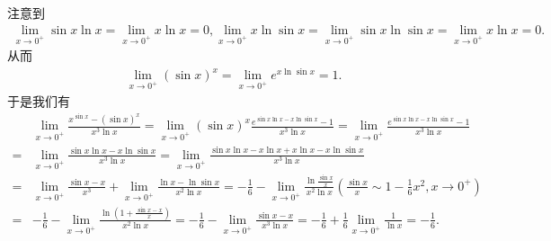 \documentclass[lang=cn,newtx,10pt,scheme=chinese]{elegantbook}
\begin{document}
\begin{solution}
注意到\begin{align*}
   \lim_{x\rightarrow0^{+}}\sin x\ln x=\lim_{x\rightarrow0^{+}}x\ln x = 0, \lim_{x\rightarrow0^{+}}x\ln\sin x=\lim_{x\rightarrow0^{+}}\sin x\ln\sin x=\lim_{x\rightarrow0^{+}}x\ln x = 0.
\end{align*}
从而
\begin{align*}
   \lim_{x\rightarrow 0^+} (\sin x)^x=\lim_{x\rightarrow 0^+} e^{x\ln\sin x}=1.
\end{align*}
于是我们有
   \begin{align*}
   &\lim_{x\rightarrow0^{+}}\frac{x^{\sin x}-(\sin x)^{x}}{x^{3}\ln x}=\lim_{x\rightarrow0^{+}}(\sin x)^{x}\frac{e^{\sin x\ln x - x\ln\sin x}-1}{x^{3}\ln x}=\lim_{x\rightarrow0^{+}}\frac{e^{\sin x\ln x - x\ln\sin x}-1}{x^{3}\ln x}\\
   =&\lim_{x\rightarrow0^{+}}\frac{\sin x\ln x - x\ln\sin x}{x^{3}\ln x}=\lim_{x\rightarrow0^{+}}\frac{\sin x\ln x - x\ln x + x\ln x - x\ln\sin x}{x^{3}\ln x}\\
   =&\lim_{x\rightarrow0^{+}}\frac{\sin x - x}{x^{3}}+\lim_{x\rightarrow0^{+}}\frac{\ln x - \ln\sin x}{x^{2}\ln x}=-\frac{1}{6}-\lim_{x\rightarrow0^{+}}\frac{\ln\frac{\sin x}{x}}{x^{2}\ln x}(\frac{\sin x}{x}\sim1 - \frac{1}{6}x^{2},x\to 0^+)\\
   =&-\frac{1}{6}-\lim_{x\rightarrow0^{+}}\frac{\ln(1 + \frac{\sin x - x}{x})}{x^{2}\ln x}=-\frac{1}{6}-\lim_{x\rightarrow0^{+}}\frac{\sin x - x}{x^{3}\ln x}=-\frac{1}{6}+\frac{1}{6}\lim_{x\rightarrow0^{+}}\frac{1}{\ln x}=-\frac{1}{6}.
   \end{align*}
\end{solution}
\end{document}
